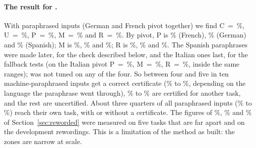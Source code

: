 \paragraph{The result for \cert{}.} With \WidenParaInputs{} paraphrased inputs (German and
French pivot together) we find \textsf{C}~=~\WidenRefTfiveC{}\%, \textsf{U}~=~\WidenRefTfiveU{}\%, \textsf{P}~=~\WidenRefTfiveP{}\%,
\textsf{M}~=~\WidenRefTfiveM{}\% and \textsf{R}~=~\WidenRefTfiveR{}\%. By pivot, \textsf{P} is \WidenRefTfiveFrP{}\% (French),
\WidenRefTfiveDeP{}\% (German) and \WidenRefTfiveEsP{}\% (Spanish); \textsf{M} is \WidenRefTfiveFrM{}\%,
\WidenRefTfiveDeM{}\% and \WidenRefTfiveEsM{}\%; \textsf{R} is \WidenRefTfiveFrR{}\%, \WidenRefTfiveDeR{}\% and
\WidenRefTfiveEsR{}\%. The Spanish paraphrases were made later, for the check described below, and the Italian ones last, for the fallback tests (on the Italian pivot \textsf{P}~=~\WidenRefTfiveItP{}\%, \textsf{M}~=~\WidenRefTfiveItM{}\%,
\textsf{R}~=~\WidenRefTfiveItR{}\%, inside the same ranges); \cert{} was not tuned on any of the four. So between four and five in ten machine-paraphrased inputs get a correct certificate
(\WidenRefTfivePLow{}\% to \WidenRefTfivePHigh{}\%, depending on the language the paraphrase went through), \WidenRefTfiveMLow{}\% to
\WidenRefTfiveMHigh{}\% are certified for another task, and the rest are uncertified. About three quarters of all paraphrased inputs (\WidenRefTfiveRLow{}\% to \WidenRefTfiveRHigh{}\%) reach their own task, with or
without a certificate. The figures of \FiveCertRightLight{}\%, \FiveCertRightMedium{}\% and
\FiveCertRightHeavy{}\% of Section~\ref{sec:reworded} were measured on five tasks that are far apart and on the development
rewordings. This is a limitation of the method as built: the zones are narrow at scale.

